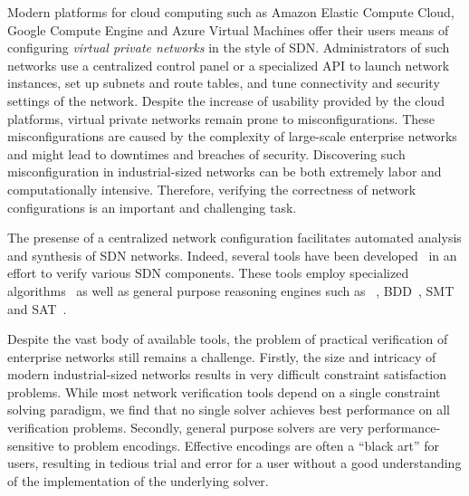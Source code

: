 Modern platforms for cloud computing such as Amazon Elastic Compute Cloud, Google Compute Engine and Azure Virtual Machines offer their users means of configuring \emph{virtual private networks} in the style of SDN. Administrators of such networks use a centralized control panel or a specialized API to launch network instances, set up subnets and route tables, and tune connectivity and security settings of the network. Despite the increase of usability provided by the cloud platforms, virtual private networks remain prone to misconfigurations. These 
misconfigurations are caused by the complexity of large-scale enterprise networks and might lead to downtimes and breaches of 
security. Discovering such misconfiguration in industrial-sized networks can be both extremely labor and computationally intensive. Therefore, 
verifying the correctness of network configurations is an important and challenging task.

The presense of a centralized network configuration facilitates automated analysis and synthesis of SDN networks. Indeed, several tools have been 
developed~\cite{batfish,jayaraman2014automated,DBLP:conf/icdcit/BjornerJ15,DBLP:conf/pldi/BallBGIKSSV14,Veriflow,ConfigChecker,Anteater,DBLP:conf/cav/El-HassanyTVV17} in an effort to verify various SDN components. These tools employ specialized algorithms~\cite{Veriflow} as well as general purpose 
reasoning engines such as 
\Datalog~\cite{muZ, DBLP:conf/cav/El-HassanyTVV17}, BDD~\cite{ConfigChecker}, SMT~\cite{jayaraman2014automated,DBLP:conf/icdcit/BjornerJ15} 
and SAT~\cite{Anteater,DBLP:conf/pldi/BallBGIKSSV14}.

%
%
Despite the vast body of available tools, the problem of practical verification of enterprise networks still remains a 
challenge. Firstly, the size and intricacy of modern industrial-sized networks results in very difficult constraint 
satisfaction problems. While most network verification 
tools depend on a single constraint solving paradigm, we find that no single solver achieves best performance on all 
verification problems. Secondly, general purpose solvers are very 
performance-sensitive to problem encodings. Effective encodings are often a ``black art'' for users, resulting in tedious trial 
and error for a user without a good understanding of the implementation of the underlying solver.

